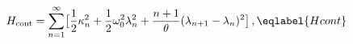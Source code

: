 \begin{equation}
H_{\rm cont} = \sum_{n=1}^\infty \bigl[{\frac12} \kappa_n^2
+ \frac12 \omega_0^2 \lambda_n^2
+ \frac{n+1}\theta (\lambda_{n+1}-\lambda_n)^2 \bigr] \,,
\eqlabel{Hcont}
\end{equation}

